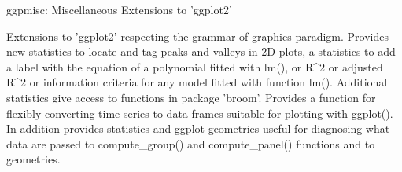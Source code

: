 ggpmisc: Miscellaneous Extensions to 'ggplot2'

Extensions to 'ggplot2' respecting the grammar of graphics paradigm. Provides new statistics to locate and tag peaks and valleys in 2D plots, a statistics to add a label with the equation of a polynomial fitted with lm(), or R^2 or adjusted R^2 or information criteria for any model fitted with function lm(). Additional statistics give access to functions in package 'broom'. Provides a function for flexibly converting time series to data frames suitable for plotting with ggplot(). In addition provides statistics and ggplot geometries useful for diagnosing what data are passed to compute_group() and compute_panel() functions and to geometries.
